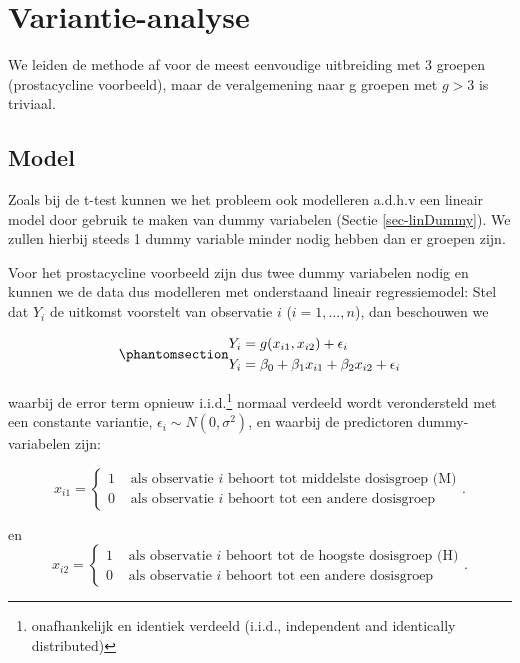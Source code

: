 \documentclass[
  dutch,
  letterpaper,
  12pt]{book}
\theoremstyle{definition}
\theoremstyle{definition}
\theoremstyle{definition}
\theoremstyle{remark}
\begin{document}
\section{Variantie-analyse}\label{variantie-analyse}

We leiden de methode af voor de meest eenvoudige uitbreiding met 3
groepen (prostacycline voorbeeld), maar de veralgemening naar g groepen
met \(g>3\) is triviaal.

\subsection{Model}\label{model-2}

Zoals bij de t-test kunnen we het probleem ook modelleren a.d.h.v een
lineair model door gebruik te maken van dummy variabelen (Sectie
\ref{sec-linDummy}). We zullen hierbij steeds 1 dummy variable minder
nodig hebben dan er groepen zijn.

Voor het prostacycline voorbeeld zijn dus twee dummy variabelen nodig en
kunnen we de data dus modelleren met onderstaand lineair regressiemodel:
Stel dat \(Y_i\) de uitkomst voorstelt van observatie \(i\)
(\(i=1,\ldots, n\)), dan beschouwen we

\begin{equation}\protect\phantomsection\label{eq-regmu3}{
\begin{aligned}
  Y_i &= g(x_{i1},x_{i2}) + \epsilon_i\\
  Y_i &= \beta_0+\beta_1 x_{i1} +\beta_2 x_{i2} +\epsilon_i
\end{aligned}
}\end{equation}

waarbij de error term opnieuw i.i.d.\footnote{onafhankelijk en identiek
  verdeeld (i.i.d., independent and identically distributed)} normaal
verdeeld wordt verondersteld met een constante variantie,
\(\epsilon_i\sim N(0,\sigma^2)\), en waarbij de predictoren
dummy-variabelen zijn:

\[x_{i1} = \left\{ \begin{array}{ll}
1 & \text{ als observatie $i$ behoort tot middelste dosisgroep (M)} \\
0 & \text{ als observatie $i$ behoort tot  een andere dosisgroep} \end{array}\right. .\]

en \[x_{i2} = \left\{ \begin{array}{ll}
1 & \text{ als observatie $i$ behoort tot de hoogste dosisgroep (H)} \\
0 & \text{ als observatie $i$ behoort tot een andere dosisgroep} \end{array}\right. .\]
\end{document}
